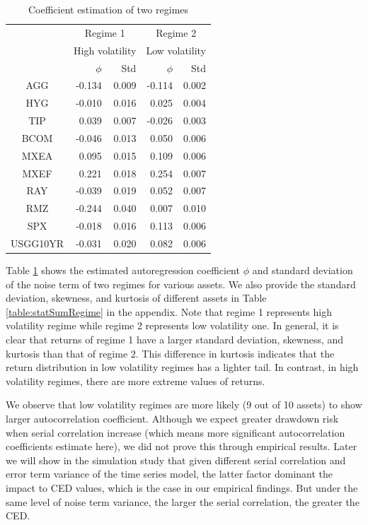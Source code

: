 \documentclass[11pt]{article}
\begin{document}
\begin{table}
\centering 
\begin{tabular}{ | c || r r | r r | } 
    \hline
    & \multicolumn{2}{c|}{Regime 1}  & 
    \multicolumn{2}{c|}{Regime 2} \\
     & \multicolumn{2}{c|}{High volatility}  & 
    \multicolumn{2}{c|}{Low volatility} \\
    & $\phi$ & Std & $\phi$ &  Std \\
     \hline \hline
    AGG  & -0.134 & 0.009 & -0.114 & 0.002 \\ 
    HYG & -0.010 & 0.016 & 0.025 & 0.004 \\ 
    TIP &  0.039 & 0.007 & -0.026 & 0.003 \\ 
    BCOM & -0.046 & 0.013 & 0.050 & 0.006 \\ 
    MXEA & 0.095 & 0.015 & 0.109 & 0.006 \\ 
    MXEF & 0.221 & 0.018 & 0.254 & 0.007\\ 
    RAY& -0.039  & 0.019 & 0.052 & 0.007\\ 
    RMZ & -0.244 & 0.040 & 0.007 & 0.010\\ 
    SPX & -0.018 & 0.016 & 0.113 & 0.006\\ 
    USGG10YR & -0.031 & 0.020 & 0.082 & 0.006\\ 
    \hline
\end{tabular}
\caption{Coefficient estimation of two regimes} 
\label{table:autoCoeffRegime}
\end{table} 

Table \ref{table:autoCoeffRegime} shows the estimated autoregression coefficient $\phi$ and standard deviation of the noise term of two regimes for various assets. We also provide the standard deviation, skewness, and kurtosis of different assets in Table \ref{table:statSumRegime} in the appendix. Note that regime 1 represents high volatility regime while regime 2 represents low volatility one. In general, it is clear that returns of regime 1 have a larger standard deviation, skewness, and kurtosis than that of regime 2. This difference in kurtosis indicates that the return distribution in low volatility regimes has a lighter tail. In contrast, in high volatility regimes, there are more extreme values of returns.

We observe that low volatility regimes are more likely (9 out of 10 assets) to show larger autocorrelation coefficient. Although we expect greater drawdown risk when serial correlation increase (which means more significant autocorrelation coefficients estimate here), we did not prove this through empirical results. Later we will show in the simulation study that given different serial correlation and error term variance of the time series model, the latter factor dominant the impact to CED values, which is the case in our empirical findings. But under the same level of noise term variance, the larger the serial correlation, the greater the CED.
\end{document}
